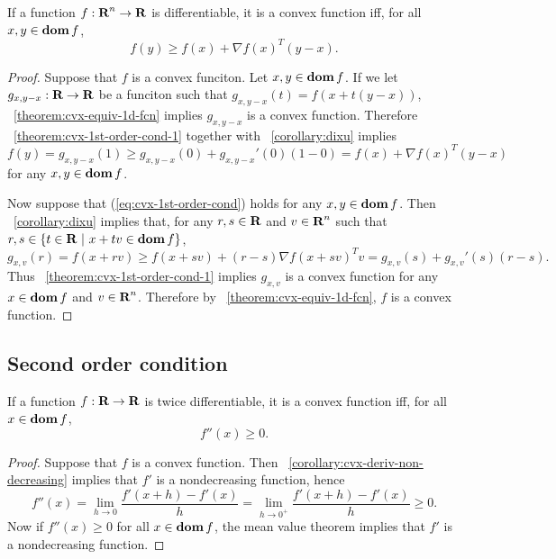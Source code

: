 \documentclass[10pt, twoside]{book}   	%
\begin{document}
\begin{corollary}
\label{corollary:cvx-1st-order-cond}
If a function $f:{\mbox{\bf R}}^n\to{\mbox{\bf R}}$ is differentiable, it is a convex function iff, for all $x,y \in \mathop{\bf dom} f$,
\begin{equation}
\label{eq:cvx-1st-order-cond}
        f(y) \geq f(x) + \nabla f(x)^T (y-x).
\end{equation}
\end{corollary}

\begin{proof}
Suppose that $f$ is a convex funciton.
Let $x,y\in\mathop{\bf dom} f$.
If we let $g_{x,y-x}:{\mbox{\bf R}}\to{\mbox{\bf R}}$ be a funciton such that $g_{x,y-x}(t) = f(x+t(y-x))$,
\theoremname~\ref{theorem:cvx-equiv-1d-fcn} implies $g_{x,y-x}$ is a convex function.
Therefore \theoremname~\ref{theorem:cvx-1st-order-cond-1} together with \corollaryname~\ref{corollary:dixu}
implies
\[
f(y) = g_{x,y-x}(1) \geq g_{x,y-x}(0) + g_{x,y-x}'(0) (1-0)
= f(x) + \nabla f(x) ^T (y-x)
\]
for any $x,y \in \mathop{\bf dom} f$.

Now suppose that (\ref{eq:cvx-1st-order-cond}) holds for any $x,y \in \mathop{\bf dom} f$.
Then \corollaryname~\ref{corollary:dixu} implies that,
for any $r,s\in{\mbox{\bf R}}$ and $v\in{\mbox{\bf R}}^n$ such that $r,s\in\{t\in{\mbox{\bf R}}~|~x+tv\in\mathop{\bf dom} f\}$,
\[
g_{x,v}(r) = f(x+rv) \geq f(x+sv) + (r-s) \nabla f(x+sv)^T v = g_{x,v}(s) + g_{x,v}'(s)(r-s).
\]
Thus \theoremname~\ref{theorem:cvx-1st-order-cond-1} implies
$g_{x,v}$ is a convex function for any $x\in\mathop{\bf dom} f$ and $v\in{\mbox{\bf R}}^n$.
Therefore by \theoremname~\ref{theorem:cvx-equiv-1d-fcn}, $f$ is a convex function.
\end{proof}

\subsection{Second order condition}

\begin{theorem}
\label{theorem:cvx-2nd-order-cond-1}
If a function $f:{\mbox{\bf R}}\to{\mbox{\bf R}}$ is twice differentiable, it is a convex function iff, for all $x \in \mathop{\bf dom} f$,
\begin{equation}
\label{eq:cvx-2nd-order-cond-1}
        f''(x) \geq 0.
\end{equation}
\end{theorem}

\begin{proof}
Suppose that $f$ is a convex function.
Then \corollaryname~\ref{corollary:cvx-deriv-non-decreasing} implies that $f'$ is a nondecreasing function,
hence
\[
f''(x)
= \lim_{h\to0} \frac{f'(x+h) - f'(x)}{h}
= \lim_{h\to0^+} \frac{f'(x+h) - f'(x)}{h} \geq 0.
\]
Now if $f''(x)\geq0$ for all $x\in\mathop{\bf dom} f$, the mean value theorem implies that $f'$ is a nondecreasing function.
\end{proof}
\end{document}
